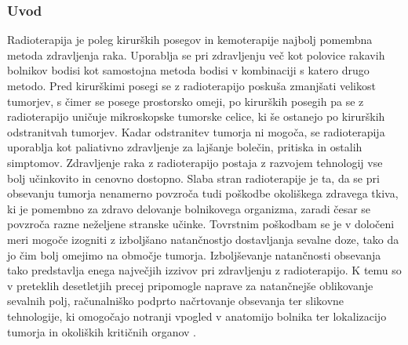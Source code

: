 \documentclass[a4paper,twoside,11pt]{article}
\begin{document}
	\subsubsection*{Uvod}
	\par{
	  Radioterapija je poleg kirurških posegov in kemoterapije najbolj pomembna metoda zdravljenja raka. Uporablja se pri zdravljenju več kot polovice rakavih bolnikov bodisi kot samostojna metoda bodisi v kombinaciji s katero drugo metodo. Pred kirurškimi posegi se z radioterapijo poskuša zmanjšati velikost tumorjev, s čimer se posege prostorsko omeji, po kirurških posegih pa se z radioterapijo uničuje mikroskopske tumorske celice, ki še ostanejo po kirurških odstranitvah tumorjev. Kadar odstranitev tumorja ni mogoča, se radioterapija uporablja kot paliativno zdravljenje za lajšanje bolečin, pritiska in ostalih simptomov. Zdravljenje raka z radioterapijo postaja z razvojem tehnologij vse bolj učinkovito in cenovno dostopno. Slaba stran radioterapije je ta, da se pri obsevanju tumorja nenamerno povzroča tudi poškodbe okoliškega zdravega tkiva, ki je pomembno za zdravo delovanje bolnikovega organizma, zaradi česar se povzroča razne neželjene stranske učinke. Tovrstnim poškodbam se je v določeni meri mogoče izogniti z izboljšano natančnostjo dostavljanja sevalne doze, tako da jo čim bolj omejimo na območje tumorja. Izboljševanje natančnosti obsevanja tako predstavlja enega največjih izzivov pri zdravljenju z radioterapijo. K temu so v preteklih desetletjih precej pripomogle naprave za natančnejše oblikovanje sevalnih polj, računalniško podprto načrtovanje obsevanja ter slikovne tehnologije, ki omogočajo notranji vpogled v anatomijo bolnika ter lokalizacijo tumorja in okoliških kritičnih organov \citep{baskar2012,jaffray2012}.
	} %
\end{document}
